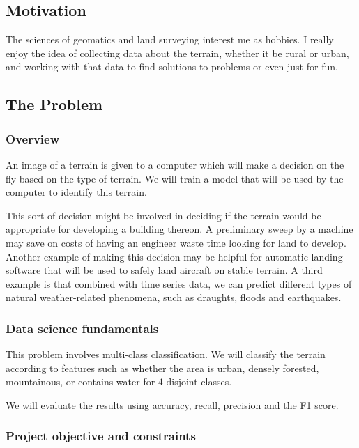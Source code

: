 \documentclass[11pt]{report}
\begin{document}
\subsection{Motivation}

The sciences of geomatics and land surveying interest me as hobbies.
I really enjoy the idea of collecting data about the terrain,
whether it be rural or urban,
and working with that data to find solutions to problems
or even just for fun.

\subsection{The Problem}

\subsubsection{Overview}

An image of a terrain is given to a computer which will make a decision on the fly based on the type of terrain.
We will train a model that will be used by the computer to identify this terrain.

This sort of decision might be involved in deciding if the terrain would be appropriate for developing a building thereon.
A preliminary sweep by a machine may save on costs of having an engineer waste time looking for land to develop.
Another example of making this decision may be helpful for automatic landing software that will be used to safely land aircraft on stable terrain.
A third example is that combined with time series data, we can predict different types of natural weather-related phenomena,
such as draughts, floods and earthquakes.

\subsubsection{Data science fundamentals}

This problem involves multi-class classification.
We will classify the terrain according to features such as whether the area is
urban, densely forested, mountainous, or contains water
for \(4\) disjoint classes.

We will evaluate the results using
accuracy, recall, precision and the F1 score.

\subsubsection{Project objective and constraints}
\end{document}
